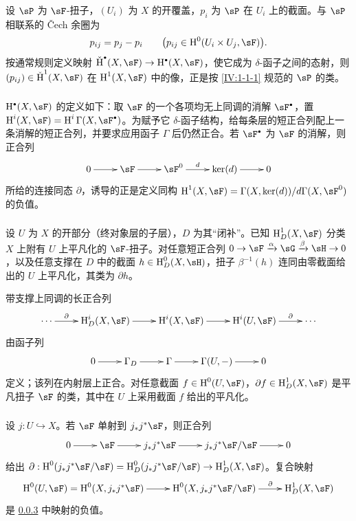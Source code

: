 \subsubsection{}\label{IV:1-1-2}
设 $\sP$ 为 $\sF$-扭子，$(U_i)$ 为 $X$ 的开覆盖，$p_i$ 为 $\sP$ 在 $U_i$ 上的截面。与 $\sP$ 相联系的 Čech 余圈为
\[
p_{ij}=p_j-p_i\qquad\bigl(p_{ij}\in\h^0(U_i\times U_j,\sF)\bigr).
\]
按通常规则定义映射 $\operatorname{\check H}^\bullet(X,\sF)\to\h^\bullet(X,\sF)$，使它成为 $\delta$-函子之间的态射，则 $(p_{ij})\in\operatorname{\check H}^1(X,\sF)$ 在 $\h^1(X,\sF)$ 中的像，正是按 \ref{IV:1-1-1} 规范的 $\sP$ 的类。

\subsubsection{}\label{IV:1-1-3}
$\h^\bullet(X,\sF)$ 的定义如下：取 $\sF$ 的一个各项均无上同调的消解 $\sF^\bullet$，置 $\h^i(X,\sF)=\h^i\Gamma(X,\sF^\bullet)$。为赋予它 $\delta$-函子结构，给每条层的短正合列配上一条消解的短正合列，并要求应用函子 $\Gamma$ 后仍然正合。若 $\sF^\bullet$ 为 $\sF$ 的消解，则正合列
\[\xymatrix{0\ar[r]&\sF\ar[r]&\sF^0\ar[r]^-d&\ker(d)\ar[r]&0}\]
所给的连接同态 $\partial$，诱导的正是定义同构
$\h^1(X,\sF)=\Gamma(X,\ker(d))/d\Gamma(X,\sF^0)$ 的负值。

\subsubsection{}\label{IV:1-1-4}
设 $U$ 为 $X$ 的开部分（终对象层的子层），$D$ 为其“闭补”。已知 $\h_D^1(X,\sF)$ 分类 $X$ 上附有 $U$ 上平凡化的 $\sF$-扭子。对任意短正合列 $0\to\sF\xrightarrow\alpha\sG\xrightarrow\beta\sH\to0$，以及任意支撑在 $D$ 中的截面 $h\in\h_D^0(X,\sH)$，扭子 $\beta^{-1}(h)$ 连同由零截面给出的 $U$ 上平凡化，其类为 $\partial h$。

带支撑上同调的长正合列
\[\xymatrix{\cdots\ar[r]^-\partial&\h_D^i(X,\sF)\ar[r]&\h^i(X,\sF)\ar[r]&\h^i(U,\sF)\ar[r]^-\partial&\cdots}\]
由函子列
\[\xymatrix{0\ar[r]&\Gamma_D\ar[r]&\Gamma\ar[r]&\Gamma(U,-)\ar[r]&0}\]
定义；该列在内射层上正合。对任意截面 $f\in\h^0(U,\sF)$，$\partial f\in\h_D^1(X,\sF)$ 是平凡扭子 $\sF$ 的类，其中在 $U$ 上采用截面 $f$ 给出的平凡化。

\subsubsection{}\label{IV:1-1-5}
设 $j:U\hookrightarrow X$。若 $\sF$ 单射到 $j_*j^*\sF$，则正合列
\[\xymatrix{0\ar[r]&\sF\ar[r]&j_*j^*\sF\ar[r]&j_*j^*\sF/\sF\ar[r]&0}\]
给出 $\partial:\h^0(j_*j^*\sF/\sF)=\h_D^0(j_*j^*\sF/\sF)\to\h_D^1(X,\sF)$。复合映射
\[\xymatrix{\h^0(U,\sF)=\h^0(X,j_*j^*\sF)\ar[r]&\h^0(X,j_*j^*\sF/\sF)\ar[r]^-\partial&\h_D^1(X,\sF)}\]
是 \ref{IV:1-1-4} 中映射的负值。


